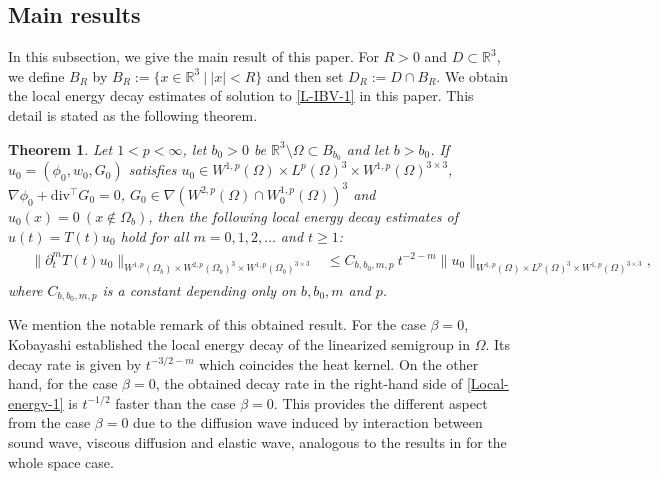 \documentclass[dvipdfmx,12pt]{article}
\newtheorem{thm}[dfn]{Theorem}
\begin{document}
\subsection{Main results}

In this subsection, we give the main result of this paper. For $R>0$ and $D\subset \mathbb{R}^3$, we define $B_R$ by $B_R:=\{x\in\mathbb{R}^3~|~|x|< R\}$ and then set $D_R:=D\cap B_R$. We obtain the local energy decay estimates of solution to \eqref{L-IBV-1} in this paper. This detail is stated as the following theorem.
\begin{thm}\label{Local-energy}
Let $1<p<\infty$, let $b_0>0$ be $\mathbb{R}^3\setminus\Omega\subset B_{b_0}$ and let $b>b_0$. If $u_0=(\phi_0,w_0,G_0)$ satisfies $u_0\in W^{1,p}(\Omega)\times L^p(\Omega)^3\times W^{1,p}(\Omega)^{3\times3}$, $\nabla\phi_0+\mathrm{div}{}^\top G_0=0$, $G_0\in \nabla(W^{2,p}(\Omega)\cap W_0^{1,p}(\Omega))^3$ and $u_0(x)=0~(x\notin\Omega_b)$, then the following local energy decay estimates of $u(t)=T(t)u_0$ hold for all $m=0,1,2,\ldots$ and $t\ge 1$:
\begin{gather}\label{Local-energy-1}
\begin{aligned}
&\|\partial_t^m T(t)u_0\|_{W^{1,p}(\Omega_b)\times W^{2,p}(\Omega_b)^3\times W^{1,p}(\Omega_b)^{3\times3}} 
&\leq C_{b,b_0,m,p} ~ t^{-2-m}\|u_0\|_{W^{1,p}(\Omega)\times L^p(\Omega)^3\times W^{1,p}(\Omega)^{3\times3}}, 
\end{aligned}
\end{gather}
where $C_{b,b_0,m,p}$ is a constant depending only on $b,b_0,m$ and $p$.
\end{thm}
We mention the notable remark of this obtained result. For the case $\beta=0$, Kobayashi \cite{K97} established the local energy decay of the linearized semigroup in $\Omega$. Its  decay rate is given by $t^{-3/2-m}$ which coincides the heat kernel. On the other hand, for the case $\beta=0$, the obtained decay rate in the right-hand side of \eqref{Local-energy-1} is $t^{-1/2}$ faster than the case $\beta=0$. This provides the different aspect from the case $\beta=0$ due to the diffusion wave induced by interaction between sound wave, viscous diffusion and elastic wave, analogous to the results in \cite{I20,I22} for the whole space case.
\end{document}
